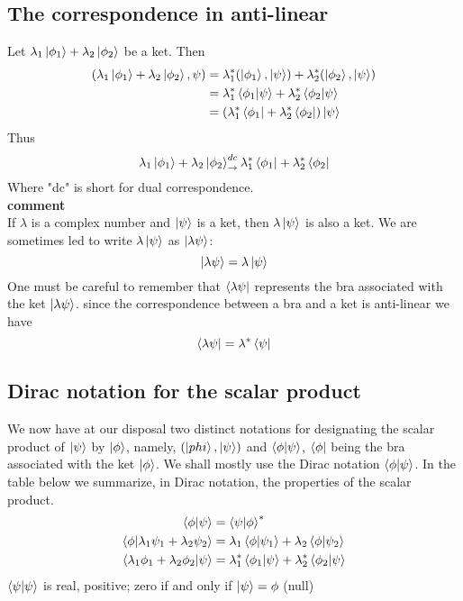 \subsection{The correspondence in anti-linear}
Let $\lambda_1\ket{\phi_1} + \lambda_2\ket{\phi_2}$  be a ket. Then
\begin{eqnarray}
	(\lambda_1\ket{\phi_1} + \lambda_2\ket{\phi_2}, \psi) 
	&= \lambda_1^* (\ket{\phi_1}, \ket{\psi}) + \lambda_2^* (\ket{\phi_2}, \ket{\psi}) \\
	&= \lambda_1^* \braket{\phi_1}{\psi} + \lambda_2^* \braket{\phi_2}{\psi}\\
	&= (\lambda_1^* \bra{\phi_1} + \lambda_2^* \bra{\phi_2}) \ket{\psi}
\end{eqnarray}
Thus
\begin{equation}
\lambda_1\ket{\phi_1} + \lambda_2 \ket{\phi_2} _\rightarrow^{dc} \lambda_1^* \bra{\phi_1} + \lambda_2^* \bra{\phi_2}
\end{equation}
Where "dc" is short for dual correspondence.\\
\textbf{comment}\\
If $\lambda$ is a complex number and $\ket{\psi}$ is a ket, then $\lambda\ket{\psi}$ is also a ket. We are sometimes led to write $\lambda\ket{\psi}$ as $\ket{\lambda\psi}$:
\begin{equation}
\ket{\lambda\psi} = \lambda \ket{\psi}
\end{equation}
One must be careful to remember that $\bra{\lambda\psi}$ represents the bra associated with the ket $\ket{\lambda\psi}$. since the correspondence between a bra and a ket is anti-linear we have
\begin{equation}
\bra{\lambda\psi} = \lambda^*\bra{\psi}
\end{equation}
\subsection{Dirac notation for the scalar product}
We now have at our disposal two distinct notations for designating the scalar product of $\ket{\psi}$ by $\ket{\phi}$, namely, $(\ket{phi}, \ket{\psi})$ and $\braket{\phi}{\psi}$, $\bra{\phi}$ being the bra associated with the ket $\ket{\phi}$. We shall mostly use the Dirac notation $\braket{\phi}{\psi}$. In the table below we summarize, in Dirac notation, the properties of the scalar product.
\begin{eqnarray}
	\braket{\phi}{\psi} &= \braket{\psi}{\phi}^* \\
	\braket{\phi}{\lambda_1\psi_1 + \lambda_2\psi_2} &= \lambda_1 \braket{\phi}{\psi_1} + \lambda_2 \braket{\phi}{\psi_2} \\
	\braket{\lambda_1\phi_1 + \lambda_2\phi_2}{\psi} &= \lambda_1^* \braket{\phi_1}{\psi} + \lambda_2^* \braket{\phi_2}{\psi} \\
\end{eqnarray}
$\braket{\psi}{\psi}$ is real, positive; zero if and only if $\ket{\psi} = \phi$ (null)




